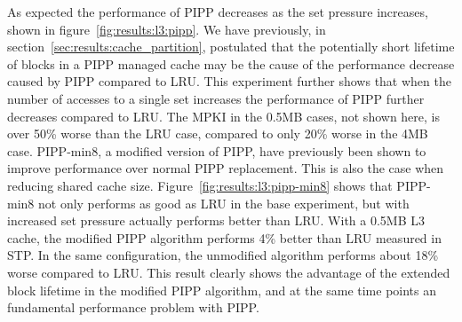 As expected the performance of PIPP decreases as the set pressure increases, shown in figure~\ref{fig:results:l3:pipp}.
We have previously, in section~\ref{sec:results:cache_partition}, postulated that the potentially short lifetime of blocks in a PIPP managed cache may be the cause of the performance decrease caused by PIPP compared to LRU.
This experiment further shows that when the number of accesses to a single set increases the performance of PIPP further decreases compared to LRU.
The MPKI in the 0.5MB cases, not shown here, is over 50\% worse than the LRU case, compared to only 20\% worse in the 4MB case.
PIPP-min8, a modified version of PIPP, have previously been shown to improve performance over normal PIPP replacement.
This is also the case when reducing shared cache size.
Figure~\ref{fig:results:l3:pipp-min8} shows that PIPP-min8 not only performs as good as LRU in the base experiment, but with increased set pressure actually performs better than LRU.
With a 0.5MB L3 cache, the modified PIPP algorithm performs 4\% better than LRU measured in STP.
In the same configuration, the unmodified algorithm performs about 18\% worse compared to LRU.
This result clearly shows the advantage of the extended block lifetime in the modified PIPP algorithm, and at the same time points an fundamental performance problem with PIPP.

